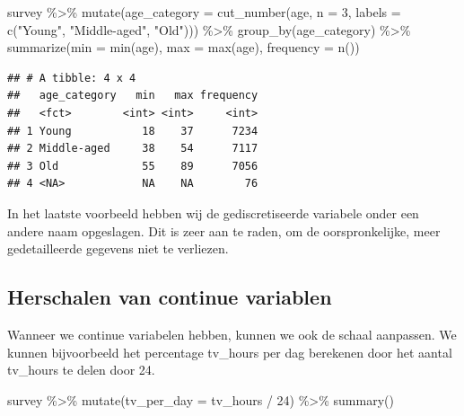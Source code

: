 \documentclass[]{tufte-book}
\newenvironment{Shaded}{}{}
\newcommand{\AttributeTok}[1]{\textcolor[rgb]{0.49,0.56,0.16}{#1}}
\newcommand{\DecValTok}[1]{\textcolor[rgb]{0.25,0.63,0.44}{#1}}
\newcommand{\FunctionTok}[1]{\textcolor[rgb]{0.02,0.16,0.49}{#1}}
\newcommand{\NormalTok}[1]{#1}
\newcommand{\SpecialCharTok}[1]{\textcolor[rgb]{0.25,0.44,0.63}{#1}}
\newcommand{\StringTok}[1]{\textcolor[rgb]{0.25,0.44,0.63}{#1}}
\begin{document}
\begin{Shaded}
\begin{Highlighting}[]
\NormalTok{survey }\SpecialCharTok{\%\textgreater{}\%}
  \FunctionTok{mutate}\NormalTok{(}\AttributeTok{age\_category =} \FunctionTok{cut\_number}\NormalTok{(age, }\AttributeTok{n =} \DecValTok{3}\NormalTok{, }\AttributeTok{labels =} \FunctionTok{c}\NormalTok{(}\StringTok{"Young"}\NormalTok{, }\StringTok{"Middle{-}aged"}\NormalTok{, }\StringTok{"Old"}\NormalTok{))) }\SpecialCharTok{\%\textgreater{}\%}
  \FunctionTok{group\_by}\NormalTok{(age\_category) }\SpecialCharTok{\%\textgreater{}\%}
  \FunctionTok{summarize}\NormalTok{(}\AttributeTok{min =} \FunctionTok{min}\NormalTok{(age), }\AttributeTok{max =} \FunctionTok{max}\NormalTok{(age), }\AttributeTok{frequency =} \FunctionTok{n}\NormalTok{())}
\end{Highlighting}
\end{Shaded}

\begin{verbatim}
## # A tibble: 4 x 4
##   age_category   min   max frequency
##   <fct>        <int> <int>     <int>
## 1 Young           18    37      7234
## 2 Middle-aged     38    54      7117
## 3 Old             55    89      7056
## 4 <NA>            NA    NA        76
\end{verbatim}

In het laatste voorbeeld hebben wij de gediscretiseerde variabele onder een andere naam opgeslagen. Dit is zeer aan te raden, om de oorspronkelijke, meer gedetailleerde gegevens niet te verliezen.

\hypertarget{herschalen-van-continue-variablen}{%
\subsection{Herschalen van continue variablen}\label{herschalen-van-continue-variablen}}

Wanneer we continue variabelen hebben, kunnen we ook de schaal aanpassen. We kunnen bijvoorbeeld het percentage tv\_hours per dag berekenen door het aantal tv\_hours te delen door 24.

\begin{Shaded}
\begin{Highlighting}[]
\NormalTok{survey }\SpecialCharTok{\%\textgreater{}\%}
  \FunctionTok{mutate}\NormalTok{(}\AttributeTok{tv\_per\_day =}\NormalTok{ tv\_hours }\SpecialCharTok{/} \DecValTok{24}\NormalTok{) }\SpecialCharTok{\%\textgreater{}\%}
  \FunctionTok{summary}\NormalTok{()}
\end{Highlighting}
\end{Shaded}
\end{document}
